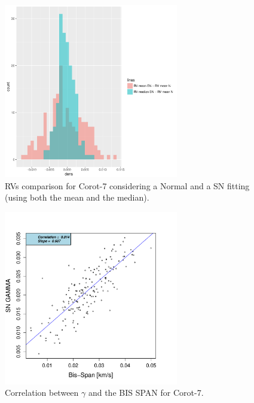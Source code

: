 \documentclass[11pt, oneside]{article}
\begin{document}
%
\begin{figure}[htbp]
   \centering
\includegraphics[height = 3in]{[0]LRa01_E_HistogramsDiff.pdf} 
   \caption{RVs comparison for Corot-7 considering a Normal and a SN fitting (using both the mean and the median).}
   \label{fig:corot7:RV}
\end{figure}
%
\begin{figure}[htbp]
   \centering
\includegraphics[height = 3in]{LRa01_E_[2]gamma_vs_bisspan.pdf} 
   \caption{Correlation between $\gamma$ and the BIS SPAN for Corot-7.}
   \label{fig:Corot7:corr.gamma}
\end{figure}
%
\fi
%


%


\end{document}
